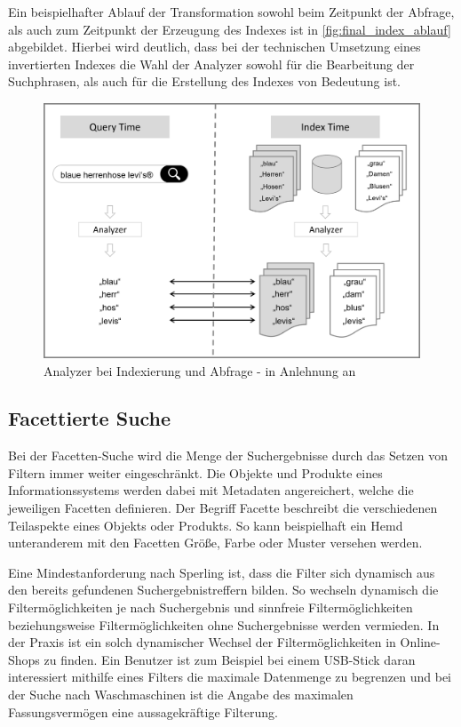 Ein beispielhafter Ablauf der Transformation sowohl beim Zeitpunkt der Abfrage, als auch zum Zeitpunkt der Erzeugung des Indexes ist in \autoref{fig:final_index_ablauf} abgebildet. Hierbei wird deutlich, dass bei der technischen Umsetzung eines invertierten Indexes die Wahl der Analyzer sowohl für die Bearbeitung der Suchphrasen, als auch für die Erstellung des Indexes von Bedeutung ist.

\begin{figure}[H]
    \centering
    \includegraphics[width=0.7\linewidth]{images/Query_Index_Time.png}
    \caption{Analyzer bei Indexierung und Abfrage - in Anlehnung an \cite{SebastianRuss.2017}}
    \label{fig:final_index_ablauf}
\end{figure}

\subsection{Facettierte Suche\label{subsec2.3.3:Unterunterpunkt-3}}

Bei der Facetten-Suche wird die Menge der Suchergebnisse durch das Setzen von Filtern immer weiter eingeschränkt. Die Objekte und Produkte eines Informationssystems werden dabei mit Metadaten angereichert, welche die jeweiligen Facetten definieren. Der Begriff Facette beschreibt die verschiedenen Teilaspekte eines Objekts oder Produkts. So kann beispielhaft ein \glqq Hemd\grqq{} unteranderem mit den Facetten \glqq Größe\grqq{}, \glqq Farbe\grqq{} oder \glqq Muster\grqq{} versehen werden.

Eine Mindestanforderung nach Sperling \cite{Martin.2018} ist, dass die Filter sich dynamisch aus den bereits gefundenen Suchergebnistreffern bilden. So wechseln dynamisch die Filtermöglichkeiten je nach Suchergebnis und sinnfreie Filtermöglichkeiten beziehungsweise Filtermöglichkeiten ohne Suchergebnisse werden vermieden. In der Praxis ist ein solch dynamischer Wechsel der Filtermöglichkeiten in Online-Shops zu finden. Ein Benutzer ist zum Beispiel bei einem USB-Stick daran interessiert mithilfe eines Filters die maximale Datenmenge zu begrenzen und bei der Suche nach Waschmaschinen ist die Angabe des maximalen Fassungsvermögen eine aussagekräftige Filterung.

